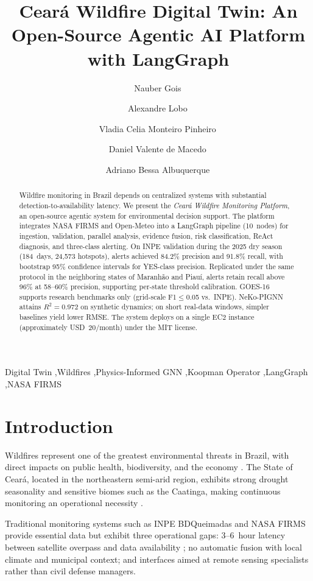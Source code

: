 \documentclass[preprint,12pt,times,numbers]{elsarticle}
\title{Ceará Wildfire Digital Twin: An Open-Source Agentic AI Platform with LangGraph}
\author[unifor,cor1]{Nauber Gois\corref{cor1}\,\orcidlink{0000-0001-9361-8659}}
\author[usj]{Alexandre Lobo\,\orcidlink{0009-0000-4099-7878}}
\author[ifce]{Vladia Celia Monteiro Pinheiro\,\orcidlink{0000-0002-9851-8304}}
\author[saxion]{Daniel Valente de Macedo\,\orcidlink{0000-0003-4720-6850}}
\author[unifor]{Adriano Bessa Albuquerque\,\orcidlink{0000-0002-1491-655X}}
\begin{document}
\begin{frontmatter}

\begin{abstract}
Wildfire monitoring in Brazil depends on centralized systems with substantial detection-to-availability latency. We present the \emph{Ceará Wildfire Monitoring Platform}, an open-source agentic system for environmental decision support. The platform integrates NASA FIRMS and Open-Meteo into a LangGraph pipeline (10~nodes) for ingestion, validation, parallel analysis, evidence fusion, risk classification, ReAct diagnosis, and three-class alerting. On INPE validation during the 2025 dry season (184~days, 24{,}573 hotspots), alerts achieved 84.2\% precision and 91.8\% recall, with bootstrap 95\% confidence intervals for YES-class precision. Replicated under the same protocol in the neighboring states of Maranh\~{a}o and Piau\'{i}, alerts retain recall above 96\% at 58--60\% precision, supporting per-state threshold calibration. GOES-16 supports research benchmarks only (grid-scale F1$\leq$0.05 vs.\ INPE). NeKo-PIGNN attains $R^2=0.972$ on synthetic dynamics; on short real-data windows, simpler baselines yield lower RMSE. The system deploys on a single EC2 instance (approximately USD~20/month) under the MIT license.
\end{abstract}

\begin{keyword}
Digital Twin \sep Wildfires \sep Physics-Informed GNN \sep Koopman Operator \sep LangGraph \sep NASA FIRMS
\end{keyword}

\end{frontmatter}

\section{Introduction}
\label{sec:intro}

Wildfires represent one of the greatest environmental threats in Brazil, with direct impacts on public health, biodiversity, and the economy \cite{article:pivello2021,master:silva2021}. The State of Ceará, located in the northeastern semi-arid region, exhibits strong drought seasonality and sensitive biomes such as the Caatinga, making continuous monitoring an operational necessity \cite{techreport:funceme2024}.

Traditional monitoring systems such as INPE BDQueimadas and NASA FIRMS provide essential data but exhibit three operational gaps: 3--6~hour latency between satellite overpass and data availability \cite{manual:firms2024}; no automatic fusion with local climate and municipal context; and interfaces aimed at remote sensing specialists rather than civil defense managers.
\end{document}
